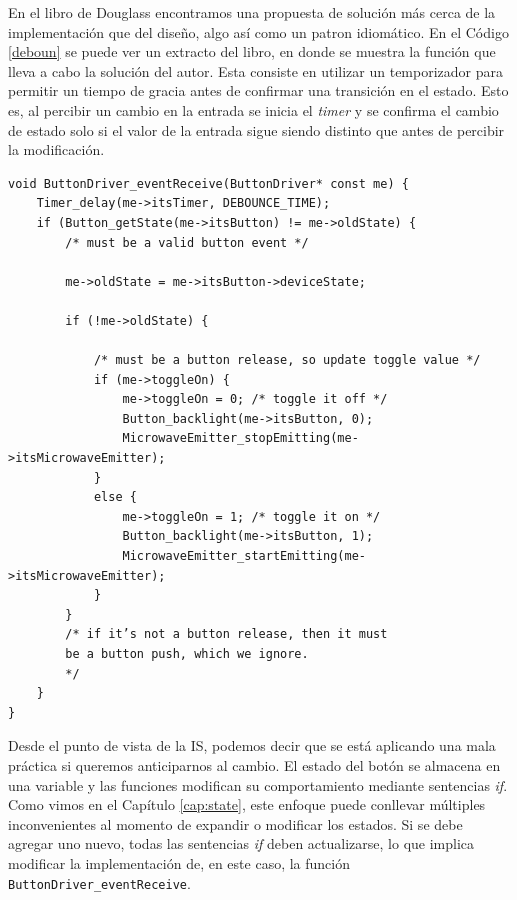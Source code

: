 En el libro de Douglass \cite{douglass} encontramos una propuesta de solución más cerca de la implementación que del diseño, algo así como un patron idiomático. En el Código \ref{deboun} se puede ver un extracto del libro, en donde se muestra la función que lleva a cabo la solución del autor. Esta consiste en utilizar un temporizador para permitir un tiempo de gracia antes de confirmar una transición en el estado. Esto es, al percibir un cambio en la entrada se inicia el \textit{timer} y se confirma el cambio de estado solo si el valor de la entrada sigue siendo distinto que antes de percibir la modificación. 

\begin{lstlisting}[caption=Código ejemplo de una estrategia de detección de rebote extraído de \cite{douglass}.,label=deboun]
void ButtonDriver_eventReceive(ButtonDriver* const me) {
    Timer_delay(me->itsTimer, DEBOUNCE_TIME);
    if (Button_getState(me->itsButton) != me->oldState) {
        /* must be a valid button event */
        
        me->oldState = me->itsButton->deviceState;
        
        if (!me->oldState) {
            
            /* must be a button release, so update toggle value */
            if (me->toggleOn) {
                me->toggleOn = 0; /* toggle it off */
                Button_backlight(me->itsButton, 0);
                MicrowaveEmitter_stopEmitting(me->itsMicrowaveEmitter);
            }
            else {
                me->toggleOn = 1; /* toggle it on */
                Button_backlight(me->itsButton, 1);
                MicrowaveEmitter_startEmitting(me->itsMicrowaveEmitter);
            }
        }
        /* if it’s not a button release, then it must
        be a button push, which we ignore.
        */
    }
}
\end{lstlisting}

Desde el punto de vista de la \gls{IS}, podemos decir que se está aplicando una mala práctica si queremos anticiparnos al cambio. El estado del botón se almacena en una variable y las funciones modifican su comportamiento mediante sentencias \textit{if}. Como vimos en el Capítulo \ref{cap:state}, este enfoque puede conllevar múltiples inconvenientes al momento de expandir o modificar los estados. Si se debe agregar uno nuevo, todas las sentencias \textit{if} deben actualizarse, lo que implica modificar la implementación de, en este caso, la función \verb|ButtonDriver_eventReceive|.

